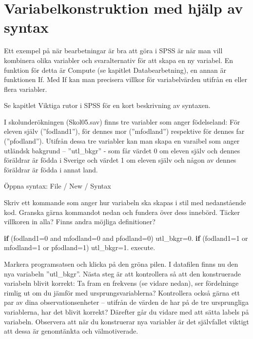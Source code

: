 \documentclass[
]{book}
\newenvironment{Shaded}{\begin{snugshade}}{\end{snugshade}}
\newcommand{\AttributeTok}[1]{\textcolor[rgb]{0.77,0.63,0.00}{#1}}
\newcommand{\ControlFlowTok}[1]{\textcolor[rgb]{0.13,0.29,0.53}{\textbf{#1}}}
\newcommand{\DecValTok}[1]{\textcolor[rgb]{0.00,0.00,0.81}{#1}}
\newcommand{\FloatTok}[1]{\textcolor[rgb]{0.00,0.00,0.81}{#1}}
\newcommand{\NormalTok}[1]{#1}
\newcommand{\OtherTok}[1]{\textcolor[rgb]{0.56,0.35,0.01}{#1}}
\begin{document}
\hypertarget{variabelkonstruktion-med-hjuxe4lp-av-syntax}{%
\chapter{Variabelkonstruktion med hjälp av syntax}\label{variabelkonstruktion-med-hjuxe4lp-av-syntax}}

Ett exempel på när bearbetningar är bra att göra i SPSS är när man vill kombinera olika variabler och
svaralternativ för att skapa en ny variabel. En funktion för detta är Compute (se kapitlet Databearbetning), en annan är funktionen If. Med If kan man precisera villkor för variabelvärden utifrån en eller flera variabler.

Se kapitlet Viktiga rutor i SPSS för en kort beskrivning av syntaxen.

I skolunderökningen (Skol05.sav) finns tre variabler som anger födelseland: För eleven själv
(''fodland1''), för dennes mor (''mfodland'') respektive för dennes far (''pfodland''). Utifrån dessa tre
variabler kan man skapa en varaibel som anger utländsk bakgrund -- ''utl\_bkgr'' - som får värdet 0 om
eleven själv och dennes föräldrar är födda i Sverige och värdet 1 om eleven själv och någon av dennes
föräldrar är födda i annat land.

Öppna syntax: File / New / Syntax

Skriv ett kommande som anger hur variabeln ska skapas i stil med nedanstående kod. Granska gärna kommandot nedan och fundera över dess innebörd. Täcker villkoren in alla? Finns andra möjliga definitioner?

\begin{Shaded}
\begin{Highlighting}[]
\ControlFlowTok{if}\NormalTok{ (}\AttributeTok{fodland1=}\DecValTok{0}\NormalTok{ and }\AttributeTok{mfodland=}\DecValTok{0}\NormalTok{ and }\AttributeTok{pfodland=}\DecValTok{0}\NormalTok{) utl\_bkgr}\OtherTok{=}\FloatTok{0.}
\ControlFlowTok{if}\NormalTok{ (}\AttributeTok{fodland1=}\DecValTok{1}\NormalTok{ or }\AttributeTok{mfodland=}\DecValTok{1}\NormalTok{ or }\AttributeTok{pfodland=}\DecValTok{1}\NormalTok{) utl\_bkgr}\OtherTok{=}\FloatTok{1.}
\NormalTok{execute.}
\end{Highlighting}
\end{Shaded}

Markera programsatsen och klicka på den gröna pilen. I datafilen finns nu den nya variabeln ''utl\_bkgr''. Nästa steg är att kontrollera så att den konstruerade
variabeln blivit korrekt: Ta fram en frekvens (se vidare nedan), ser fördelninge rimlig ut om du jämför
med ursprungsvariablerna? Kontrollera också gärna ett par av dina observationsenheter -- utifrån de
värden de har på de tre ursprungliga variablerna, har det blivit korrekt? Därefter går du vidare med att
sätta labels på variabeln. Observera att när du konstruerar nya variabler är det självfallet viktigt att dessa är genomtänkta och välmotiverade.
\end{document}
